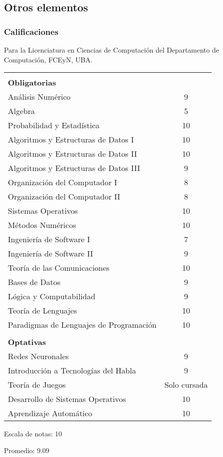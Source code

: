 \documentclass[a4paper,10pt]{article}
\begin{document}
\subsection{Otros elementos}

\subsubsection{Calificaciones}

Para la Licenciatura en Ciencias de Computación del Departamento de
Computación, FCEyN, UBA.

\begin{tabular}{ l c }
&\\

\textbf{Obligatorias} \smallskip  & \\ 
Análisis Numérico & 9\\
Algebra & 5\\
Probabilidad y Estadística & 10\\
Algoritmos y Estructuras de Datos I & 10\\
Algoritmos y Estructuras de Datos II & 10\\
Algoritmos y Estructuras de Datos III & 9\\
Organización del Computador I & 8\\
Organización del Computador II & 8\\
Sistemas Operativos & 10\\
Métodos Numéricos & 10\\
Ingeniería de Software I & 7\\
Ingeniería de Software II & 9\\
Teoría de las Comunicaciones & 10\\
Bases de Datos & 9\\
Lógica y Computabilidad & 9\\
Teoría de Lenguajes & 10\\
Paradigmas de Lenguajes de Programación & 10\\
&\\

\textbf{Optativas} \smallskip & \\
Redes Neuronales & 9\\
Introducción a Tecnologías del Habla & 9\\
Teoría de Juegos & Solo cursada\\
Desarrollo de Sistemas Operativos & 10\\
Aprendizaje Automático & 10\\
\end{tabular}

\bigskip

Escala de notas: 10

Promedio: 9.09
\end{document}
